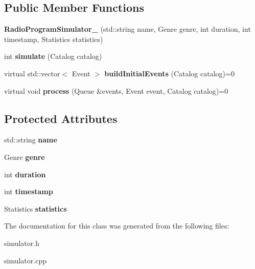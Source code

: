 \subsection*{Public Member Functions}
\begin{DoxyCompactItemize}
\item 
{\bfseries Radio\+Program\+Simulator\+\_\+} (std\+::string name, Genre genre, int duration, int timestamp, Statistics statistics)\hypertarget{class_radio_program_simulator___a9d26f2e7d90f78c684f50ebd021c05b9}{}\label{class_radio_program_simulator___a9d26f2e7d90f78c684f50ebd021c05b9}

\item 
int {\bfseries simulate} (Catalog catalog)\hypertarget{class_radio_program_simulator___aeb6546c06ad70352ace2b75f42828ec6}{}\label{class_radio_program_simulator___aeb6546c06ad70352ace2b75f42828ec6}

\item 
virtual std\+::vector$<$ Event $>$ {\bfseries build\+Initial\+Events} (Catalog catalog)=0\hypertarget{class_radio_program_simulator___a77382068d8b26c6f4fb481b8f767b728}{}\label{class_radio_program_simulator___a77382068d8b26c6f4fb481b8f767b728}

\item 
virtual void {\bfseries process} (Queue \&events, Event event, Catalog catalog)=0\hypertarget{class_radio_program_simulator___a0b6c6ce7808b0022c744c5aba6ceb0d0}{}\label{class_radio_program_simulator___a0b6c6ce7808b0022c744c5aba6ceb0d0}

\end{DoxyCompactItemize}
\subsection*{Protected Attributes}
\begin{DoxyCompactItemize}
\item 
std\+::string {\bfseries name}\hypertarget{class_radio_program_simulator___af5af6a3c060532ef056afb3716e04007}{}\label{class_radio_program_simulator___af5af6a3c060532ef056afb3716e04007}

\item 
Genre {\bfseries genre}\hypertarget{class_radio_program_simulator___a1da9ac191eaab12a6ae218a0c5301b10}{}\label{class_radio_program_simulator___a1da9ac191eaab12a6ae218a0c5301b10}

\item 
int {\bfseries duration}\hypertarget{class_radio_program_simulator___a075c27dd86b73e53b452ea830de02503}{}\label{class_radio_program_simulator___a075c27dd86b73e53b452ea830de02503}

\item 
int {\bfseries timestamp}\hypertarget{class_radio_program_simulator___a784346e99a688b8a3d2fe028116ad908}{}\label{class_radio_program_simulator___a784346e99a688b8a3d2fe028116ad908}

\item 
Statistics {\bfseries statistics}\hypertarget{class_radio_program_simulator___a4e599f9e0c91ad4299642da77ed75d0a}{}\label{class_radio_program_simulator___a4e599f9e0c91ad4299642da77ed75d0a}

\end{DoxyCompactItemize}


The documentation for this class was generated from the following files\+:\begin{DoxyCompactItemize}
\item 
simulator.\+h\item 
simulator.\+cpp\end{DoxyCompactItemize}
